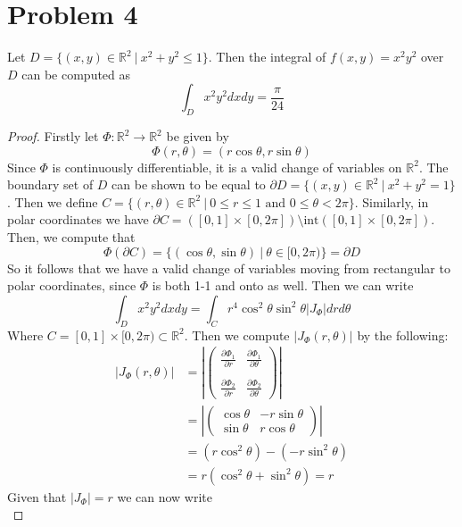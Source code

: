 \documentclass{article}
\theoremstyle{definition}
\begin{document}
\section*{Problem 4}
\begin{mdframed}[]
    Let $D = \{(x,y) \in \mathbb{R}^2 \ | \ x^2 + y^2 \leqslant 1\}$. Then the integral of $f(x,y) = x^2y^2$ over $D$ can be computed as $$\int_D x^2y^2dxdy = \frac{\pi}{24}$$
\end{mdframed}
\begin{proof}
Firstly let $\Phi : \mathbb{R}^2 \rightarrow \mathbb{R}^2$ be given by
\[
    \Phi(r,\theta) = (r\cos\theta,r\sin\theta)  
\]
Since $\Phi$ is continuously differentiable, it is a valid change of variables on $\mathbb{R}^2$.
The boundary set of $D$ can be shown to be equal to $\partial D = \{(x,y)\in\mathbb{R}^2 \ | \ x^2 + y^2 = 1\}$.
Then we define $C = \{(r,\theta)\in \mathbb{R}^2 \ | \ 0 \leqslant r \leqslant 1 \text{ and } 0 \leqslant \theta < 2\pi \}$.
Similarly, in polar coordinates we have $\partial C =  ([0,1] \times [0,2\pi]) \setminus \text{int}( [0,1] \times [0,2\pi])$.
Then, we compute that 
\[
    \Phi(\partial C)  = \{(\cos\theta,\sin\theta) \ | \ \theta \in [0,2\pi) \} = \partial D  
\]
So it follows that we have a valid change of variables moving from rectangular to polar coordinates, since $\Phi$ is both 1-1 and onto as well.
Then we can write
\[
  \int_D x^2y^2 dxdy = \int_C r^4\cos^2\theta\sin^2\theta |J_\Phi|drd\theta  
\]
Where $C = [0,1]\times[0,2\pi)\subset \mathbb{R}^2$. Then we compute $|J_\Phi(r,\theta)|$ by the following:
\begin{align*}
    |J_\Phi(r,\theta)| &=\left|\begin{pmatrix}
        \frac{\partial \Phi_1}{\partial r} & \frac{\partial \Phi_1}{\partial \theta}\\\\
        \frac{\partial \Phi_2}{\partial r} & \frac{\partial \Phi_2}{\partial \theta}
    \end{pmatrix}\right|\\
    &=\left|\begin{pmatrix}
        \cos\theta & -r\sin\theta \\
        \sin\theta & r\cos\theta
    \end{pmatrix}\right|\\
    &= (r\cos^2\theta)-(-r\sin^2\theta)\\
    &= r(\cos^2\theta + \sin^2\theta) = r
\end{align*}
Given that $|J_\Phi| = r$ we can now write 
\[
\]
\end{proof}
\end{document}
